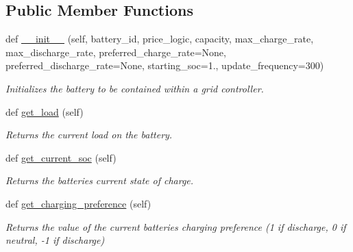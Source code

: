 \subsection*{Public Member Functions}
\begin{DoxyCompactItemize}
\item 
def \hyperlink{class_build_1_1_objects_1_1battery_1_1_battery_a4f033824699b9a467a337561a41f024a}{\+\_\+\+\_\+init\+\_\+\+\_\+} (self, battery\+\_\+id, price\+\_\+logic, capacity, max\+\_\+charge\+\_\+rate, max\+\_\+discharge\+\_\+rate, preferred\+\_\+charge\+\_\+rate=None, preferred\+\_\+discharge\+\_\+rate=None, starting\+\_\+soc=1., update\+\_\+frequency=300)
\begin{DoxyCompactList}\small\item\em Initializes the battery to be contained within a grid controller. \end{DoxyCompactList}\item 
\mbox{\label{class_build_1_1_objects_1_1battery_1_1_battery_ac493263e624c98ce6688973e35cd745b}} 
def \hyperlink{class_build_1_1_objects_1_1battery_1_1_battery_ac493263e624c98ce6688973e35cd745b}{get\+\_\+load} (self)
\begin{DoxyCompactList}\small\item\em Returns the current load on the battery. \end{DoxyCompactList}\item 
\mbox{\label{class_build_1_1_objects_1_1battery_1_1_battery_a111980cd30f418ba49e64ca9b89313d4}} 
def \hyperlink{class_build_1_1_objects_1_1battery_1_1_battery_a111980cd30f418ba49e64ca9b89313d4}{get\+\_\+current\+\_\+soc} (self)
\begin{DoxyCompactList}\small\item\em Returns the batteries current state of charge. \end{DoxyCompactList}\item 
\mbox{\label{class_build_1_1_objects_1_1battery_1_1_battery_a7f98f0d9fb7608837c17618b799c7e55}} 
def \hyperlink{class_build_1_1_objects_1_1battery_1_1_battery_a7f98f0d9fb7608837c17618b799c7e55}{get\+\_\+charging\+\_\+preference} (self)
\begin{DoxyCompactList}\small\item\em Returns the value of the current batteries charging preference (1 if discharge, 0 if neutral, -\/1 if discharge) \end{DoxyCompactList}\item 

\end{DoxyCompactItemize}
